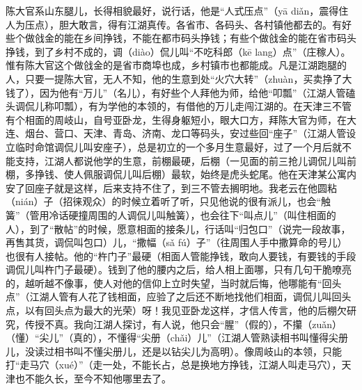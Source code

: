 \documentclass[12pt,UTF8]{ctexbook}
\begin{document}
陈大官系山东腿儿，长得相貌最好，说行话，他是“人式压点”（yā diǎn，震得住人为压点），胆大敢言，得有江湖真传。各省市、各码头、各村镇他都去的。有好些个做戗金的能在乡间挣钱，不能在都市码头挣钱；有些个做戗金的能在省市码头挣钱，到了乡村不成的，调（diào）侃儿叫“不吃科郎（kē lang）点”（庄稼人）。惟有陈大官这个做戗金的是省市商埠也成，乡村镇市也都能成。凡是江湖跑腿的人，只要一提陈大官，无人不知，他的生意到处“火穴大转”（zhuàn，买卖挣了大钱了），因为他有“万儿”（名儿），有好些个人拜他为师，给他“叩瓢”（江湖人管磕头调侃儿称叩瓢），有为学他的本领的，有借他的万儿走闯江湖的。在天津三不管有个相面的周岐山，自号亚卧龙，生得身躯短小，眼大口方，拜陈大官为师，在大连、烟台、营口、天津、青岛、济南、龙口等码头，安过些回“座子”（江湖人管设立临时命馆调侃儿叫安座子），总是初立的一个多月生意最好，过了一个月后就不能支持，江湖人都说他学的生意，前棚最硬，后棚（一见面的前三抢儿调侃儿叫前棚，多挣钱、使人佩服调侃儿叫后棚）最软，始终是虎头蛇尾。他在天津某公寓内安了回座子就是这样，后来支持不住了，到三不管去搁明地。我老云在他圆粘（nián）子（招徕观众）的时候立着听了听，只见他说的很有派儿，也会“触簧”（管用冷话硬撞周围的人调侃儿叫触簧），也会往下“叫点儿”（叫住相面的人），到了“散帖”的时候，愿意相面的接条儿，行话叫“归包口”（说完一段故事，再售其货，调侃叫包口）儿，“撒幅（sǎ fú）子”（往周围人手中撒算命的号儿）也很有人接帖。他的“杵门子”最硬（相面人管能挣钱，敢向人要钱，有要钱的手段调侃儿叫杵门子最硬）。钱到了他的腰内之后，给人相上面哪，只有几句干脆嘹亮的，越听越不像事，使人对他的信仰上立时失望，当时就后悔，他哪能有“回头点”（江湖人管有人花了钱相面，应验了之后还不断地找他们相面，调侃儿叫回头点，以有回头点为最大的光荣）呀！我见亚卧龙这样，才信人传言，他的后棚欠研究，传授不真。我向江湖人探讨，有人说，他只会“腥”（假的），不攥（zuǎn）（懂）“尖儿”（真的），不懂得“尖册（chǎi）儿”（江湖人管熟读相书叫懂得尖册儿，没读过相书叫不懂尖册儿，还是以钻尖儿为高明）。像周岐山的本领，只能打“走马穴（xué）”（走一处，不能长占，总是换地方挣钱，江湖人叫走马穴），天津也不能久长，至今不知他哪里去了。
\end{document}

